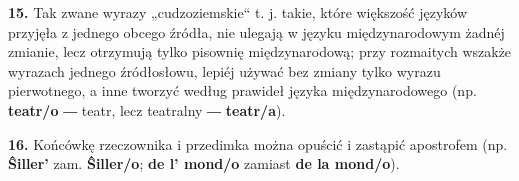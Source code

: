 \textbf{15.} Tak zwane wyrazy „cudzoziemskie“ t. j. takie, które większość języków przyjęła z jednego obcego źródła, nie ulegają w języku międzynarodowym żadnéj zmianie, lecz otrzymują tylko pisownię międzynarodową; przy rozmaitych wszakże wyrazach jednego źródłosłowu, lepiéj używać bez zmiany tylko wyrazu pierwotnego, a inne tworzyć według prawideł języka międzynarodowego (np. \textbf{teatr/o} ― teatr, lecz teatralny ― \textbf{teatr/a}).

\textbf{16.} Końcówkę rzeczownika i przedimka można opuścić i zastąpić apostrofem (np. \textbf{Ŝiller’} zam. \textbf{Ŝiller/o}; \textbf{de l’ mond/o} zamiast \textbf{de la mond/o}).

\cleardoublepage
